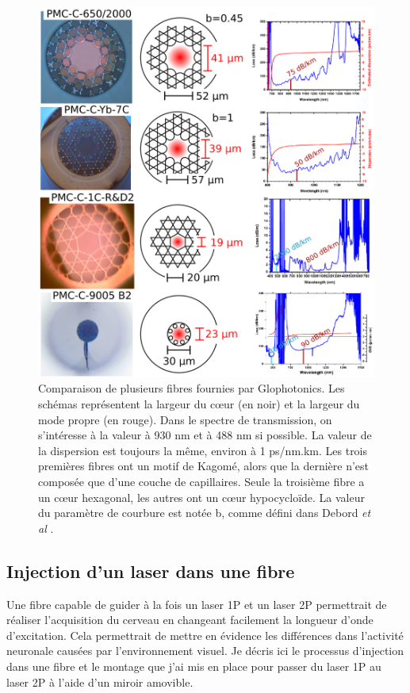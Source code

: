 \begin{figure}
\centering
\includegraphics[width=\textwidth]{./files/glofibers.svg.png}
\caption{Comparaison de plusieurs fibres fournies par Glophotonics. Les schémas représentent la largeur du cœur (en noir) et la largeur du mode propre (en rouge). Dans le spectre de transmission, on s'intéresse à la valeur à 930 nm et à 488 nm si possible. La valeur de la dispersion est toujours la même, environ à 1 ps/nm.km. Les trois premières fibres ont un motif de Kagomé, alors que la dernière n'est composée que d'une couche de capillaires. Seule la troisième fibre a un cœur hexagonal, les autres ont un cœur hypocycloïde. La valeur du paramètre de courbure est notée b, comme défini dans Debord \emph{et al} \cite{debord_hypocycloid-shaped_2013}.
}
\end{figure}


\subsection{Injection d'un laser dans une fibre}


Une fibre capable de guider à la fois un laser 1P et un laser 2P permettrait de réaliser l'acquisition du cerveau en changeant facilement la longueur d'onde d'excitation. Cela permettrait de mettre en évidence les différences dans l'activité neuronale causées par l'environnement visuel. Je décris ici le processus d'injection dans une fibre et le montage que j'ai mis en place pour passer du laser 1P au laser 2P à l'aide d'un miroir amovible. 

